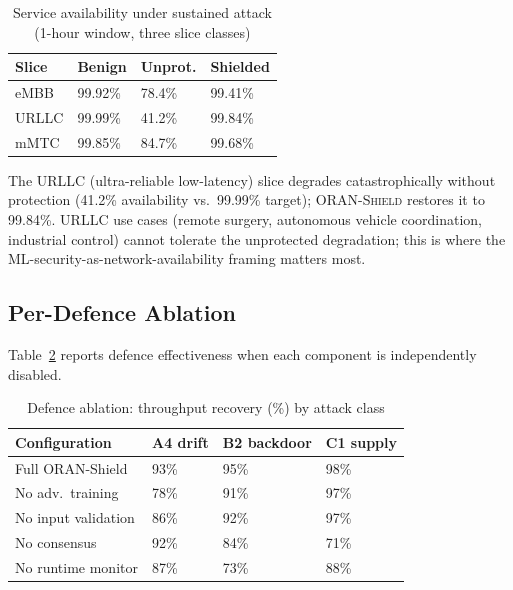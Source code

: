\documentclass[sigconf,nonacm]{acmart}
\begin{document}
\begin{table}[h]
\caption{Service availability under sustained attack (1-hour
window, three slice classes)}
\label{tab:availability}
\small
\begin{tabularx}{\columnwidth}{@{}p{2.6cm}X X X@{}}
\toprule
\textbf{Slice} & \textbf{Benign} & \textbf{Unprot.} & \textbf{Shielded} \\
\midrule
eMBB         & 99.92\% & 78.4\% & 99.41\% \\
URLLC        & 99.99\% & 41.2\% & 99.84\% \\
mMTC         & 99.85\% & 84.7\% & 99.68\% \\
\bottomrule
\end{tabularx}
\end{table}

The URLLC (ultra-reliable low-latency) slice degrades catastrophically
without protection (41.2\% availability vs.\ 99.99\% target);
\textsc{ORAN-Shield} restores it to 99.84\%. URLLC use cases
(remote surgery, autonomous vehicle coordination, industrial
control) cannot tolerate the unprotected degradation; this is
where the ML-security-as-network-availability framing matters
most.

\subsection{Per-Defence Ablation}

Table~\ref{tab:ablation} reports defence effectiveness when each
component is independently disabled.

\begin{table}[h]
\caption{Defence ablation: throughput recovery (\%) by attack class}
\label{tab:ablation}
\small
\begin{tabularx}{\columnwidth}{@{}p{2.4cm}X X X@{}}
\toprule
\textbf{Configuration} & \textbf{A4 drift} & \textbf{B2 backdoor} & \textbf{C1 supply} \\
\midrule
Full ORAN-Shield     & 93\% & 95\% & 98\% \\
No adv.\ training    & 78\% & 91\% & 97\% \\
No input validation  & 86\% & 92\% & 97\% \\
No consensus         & 92\% & 84\% & 71\% \\
No runtime monitor   & 87\% & 73\% & 88\% \\
\bottomrule
\end{tabularx}
\end{table}
\end{document}
